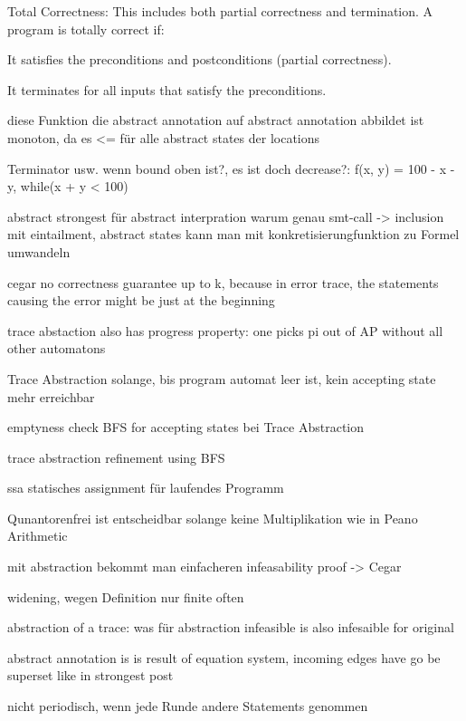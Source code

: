 \documentclass[landscape, a4paper]{article}
\begin{document}
\begin{minipage}[t]{0.2\linewidth}
\begin{betterlist}
\begin{betterlist}
			\item \alert{Total Correctness:} This includes both partial correctness and termination. A program is totally correct if:
			\begin{betterlist}
				\item It satisfies the preconditions and postconditions (partial correctness).
				\item It terminates for all inputs that satisfy the preconditions.
			\end{betterlist}
		\end{betterlist}
		\item diese Funktion die abstract annotation auf abstract annotation abbildet ist monoton, da es <= für alle abstract states der locations
		\item Terminator usw. wenn bound oben ist?, es ist doch decrease?: f(x, y) = 100 - x - y,  while(x + y < 100)
		\item abstract strongest für abstract interpration warum genau smt-call -> inclusion mit eintailment, abstract states kann man mit konkretisierungfunktion zu Formel umwandeln
		\item cegar no correctness guarantee up to k, because in error trace, the statements causing the error might be just at the beginning
		\item trace abstaction also has progress property: one picks pi out of AP without all other automatons
		\item Trace Abstraction solange, bis program automat leer ist, kein accepting state mehr erreichbar
		\item emptyness check BFS for accepting states bei Trace Abstraction
		\item trace abstraction refinement using BFS
		\item ssa statisches assignment für laufendes Programm
		\item Qunantorenfrei ist entscheidbar solange keine Multiplikation wie in Peano Arithmetic
		\item mit abstraction bekommt man einfacheren infeasability proof -> Cegar
		\item widening, wegen Definition nur finite often
		\item abstraction of a trace: was für abstraction infeasible is also infesaible for original
		\item abstract annotation is is result of equation system, incoming edges have go be superset like in strongest post
		\item nicht periodisch, wenn jede Runde andere Statements genommen

\end{betterlist}
\end{minipage}
\end{document}
